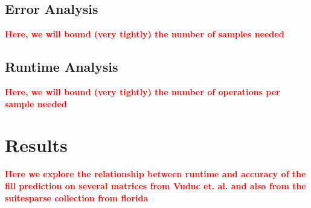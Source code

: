 \documentclass[12pt]{article}
\theoremstyle{dfn}
\numberwithin{equation}{section}
\numberwithin{figure}{section}
\newcommand{\todo}[1] {\textbf{\textcolor{red}{#1}}}
\begin{document}
    \subsection{Error Analysis}
      \todo{Here, we will bound (very tightly) the number of samples needed}
    \subsection{Runtime Analysis}
      \todo{Here, we will bound (very tightly) the number of operations per sample needed}

  \section{Results}
    \todo{Here we explore the relationship between runtime and accuracy of the fill prediction on several matrices from Vuduc et. al. and also from the suitesparse collection from florida}
\end{document}

